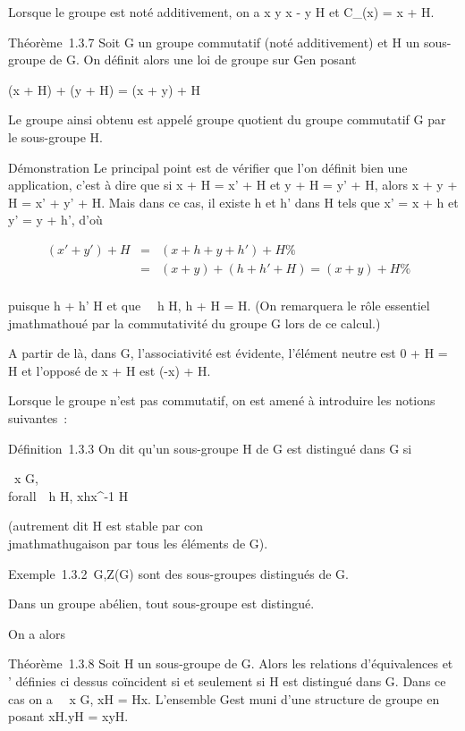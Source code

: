 Lorsque le groupe est noté additivement, on a x  y
\Leftrightarrow x - y \in H et C_(x) = x + H.

Théorème~1.3.7 Soit G un groupe commutatif (noté additivement) et H un
sous-groupe de G. On définit alors une loi de groupe sur G\diagupH en posant

(x + H) + (y + H) = (x + y) + H

Le groupe ainsi obtenu est appelé groupe quotient du groupe commutatif G
par le sous-groupe H.

Démonstration Le principal point est de vérifier que l'on définit bien
une application, c'est à dire que si x + H = x' + H et y + H = y' + H,
alors x + y + H = x' + y' + H. Mais dans ce cas, il existe h et h' dans
H tels que x' = x + h et y' = y + h', d'où

\begin{align*} (x' + y') + H& =& (x + h + y + h')
+ H \%& \\ & =& (x + y) + (h + h' + H)
= (x + y) + H\%& \\
\end{align*}

puisque h + h' \in H et que \forall~~h \in H, h + H = H.
(On remarquera le rôle essentiel \\jmathmathoué par la commutativité du groupe G
lors de ce calcul.)

A partir de là, dans G\diagupH, l'associativité est évidente, l'élément neutre
est 0 + H = H et l'opposé de x + H est (-x) + H.

Lorsque le groupe n'est pas commutatif, on est amené à introduire les
notions suivantes~:

Définition~1.3.3 On dit qu'un sous-groupe H de G est distingué dans G si

\forall~x \in G,\\forall~~h \in H,
xhx^-1 \in H

(autrement dit H est stable par con\\jmathmathugaison par tous les éléments de G).

Exemple~1.3.2 \e\,G,Z(G) sont des
sous-groupes distingués de G.

Dans un groupe abélien, tout sous-groupe est distingué.

On a alors

Théorème~1.3.8 Soit H un sous-groupe de G. Alors les relations
d'équivalences  et ' définies ci dessus coïncident si et seulement si
H est distingué dans G. Dans ce cas on a \forall~~x \in
G, xH = Hx. L'ensemble G\diagupH est muni d'une structure de groupe en posant
xH.yH = xyH.

